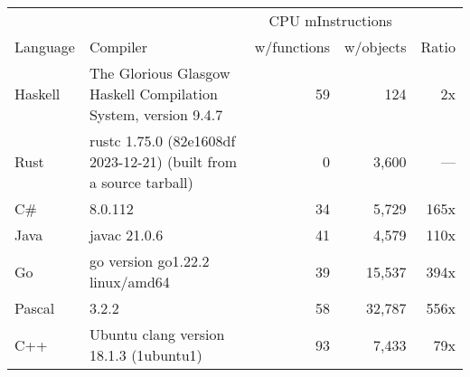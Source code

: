 \documentclass{article}
\begin{document}
      \begin{tabularx}{\linewidth}{lXrrr}
      \toprule
        & & \multicolumn{2}{c}{CPU mInstructions} & \\
        Language & Compiler & w/functions & w/objects & Ratio \\
      \midrule
    Haskell & The Glorious Glasgow Haskell Compilation System, version 9.4.7 & 59 & 124 & 2x \\
Rust & rustc 1.75.0 (82e1608df 2023-12-21) (built from a source tarball) & 0 & 3,600 & --- \\
C\# & 8.0.112 & 34 & 5,729 & 165x \\
Java & javac 21.0.6 & 41 & 4,579 & 110x \\
Go & go version go1.22.2 linux/amd64 & 39 & 15,537 & 394x \\
Pascal & 3.2.2 & 58 & 32,787 & 556x \\
C++ & Ubuntu clang version 18.1.3 (1ubuntu1) & 93 & 7,433 & 79x \\

      \bottomrule
      \end{tabularx}
      
\end{document}
